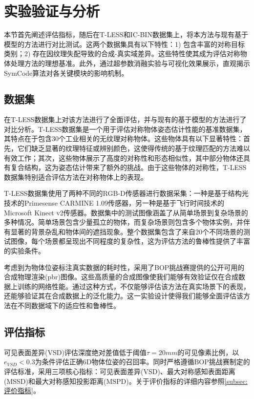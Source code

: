 \section{实验验证与分析}

本节首先阐述评估指标，随后在T-LESS\cite{tless}和IC-BIN\cite{icbin}数据集上，将本方法与现有基于模型的方法进行对比测试。这两个数据集具有以下特性：1) 包含丰富的对称目标类别；2) 存在因纹理失配导致的合成-真实域差异。这些特性使其成为评估对称物体处理方法的理想基准。此外，通过超参数消融实验与可视化效果展示，直观揭示SymCode算法对各关键模块的影响机制。

\subsection{数据集}

\par 在T-LESS数据集\cite{tless}上对该方法进行了全面评估，并与现有的基于模型的方法进行了对比分析。T-LESS数据集是一个用于评估对称物体姿态估计性能的基准数据集，其特点在于包含30个工业相关的无纹理对称物体。这些物体具有以下显著特性：首先，它们缺乏显著的纹理特征或辨别颜色，这使得传统的基于纹理匹配的方法难以有效工作；其次，这些物体展示了高度的对称性和形态相似性，其中部分物体还具有复合结构，这为姿态估计带来了额外的挑战。由于这些物体的对称性，T-LESS数据集特别适合评估方法在对称物体上的表现。
\par T-LESS数据集使用了两种不同的RGB-D传感器进行数据采集：一种是基于结构光技术的Primesense CARMINE 1.09传感器，另一种是基于飞行时间技术的Microsoft Kinect v2传感器。数据集中的测试图像涵盖了从简单场景到复杂场景的多种情况。简单场景包含少量孤立的物体，而复杂场景则包含多个物体实例，并伴有显著的背景杂乱和物体间的遮挡现象。整个数据集包含了来自20个不同场景的测试图像，每个场景都呈现出不同程度的复杂性，这为评估方法的鲁棒性提供了丰富的实验条件。
\par 考虑到为物体位姿标注真实数据的耗时性，采用了BOP挑战赛\cite{hodan2018bop}提供的公开可用的合成物理渲染(pbr)图像。这些高质量的合成图像使我们能够有效验证仅在合成数据上训练的网络性能。通过这种方式，不仅能够评估该方法在真实场景下的表现，还能够验证其在合成数据上的泛化能力。这一实验设计使得我们能够全面评估该方法在不同数据域下的适应性和鲁棒性。

\subsection{评估指标}

可见表面差异(VSD)评估深度绝对差值低于阈值$\tau=20mm$的可见像素比例，以 $e_{VSD}<0.3$\cite{pitteri2019object}为条件评估正确6D物体位姿的召回率。同时严格遵循BOP挑战赛\cite{hodan2024bop}制定的评估标准，采用三项核心指标：可见表面差异(VSD)、最大对称感知表面距离(MSSD)和最大对称感知投影距离(MSPD)。关于评价指标的详细内容参照\autoref{subsec:评价指标}。


